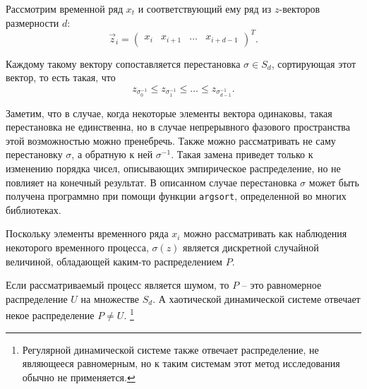 
Рассмотрим временной ряд $x_t$ и соответствующий ему ряд из $z$-векторов размерности $d$:
\begin{equation*}
    \vec z_i = \begin{pmatrix}
        x_i & x_{i+1} & \dots & x_{i+d-1}
    \end{pmatrix}^T.
\end{equation*}

Каждому такому вектору сопоставляется перестановка $\sigma \in S_d$, сортирующая этот вектор, то есть такая, что
\begin{equation*}
    z_{\sigma^{-1}_0} \leq z_{\sigma^{-1}_1} \leq \dots \leq z_{\sigma^{-1}_{d-1}}.
\end{equation*}

Заметим, что в случае, когда некоторые элементы вектора одинаковы, такая перестановка не единственна, но в случае непрерывного фазового пространства этой возможностью можно пренебречь.
Также можно рассматривать не саму перестановку $\sigma$, а обратную к ней $\sigma^{-1}$. Такая замена приведет только к изменению порядка чисел, описывающих эмпирическое распределение, но не повлияет на конечный результат.
В описанном случае перестановка $\sigma$ может быть получена программно при помощи функции \texttt{argsort}, определенной во многих библиотеках.

Поскольку элементы временного ряда $x_i$ можно рассматривать как наблюдения некоторого временного процесса, $\sigma(z)$ является дискретной случайной величиной, обладающей каким-то распределением $P$.

Если рассматриваемый процесс является шумом, то $P$ -- это равномерное распределение $U$ на множестве $S_d$.
А хаотической динамической системе отвечает некое распределение $P \neq U$.
\footnote{Регулярной динамической системе также отвечает распределение, не являющееся равномерным, но к таким системам этот метод исследования обычно не применяется.}

